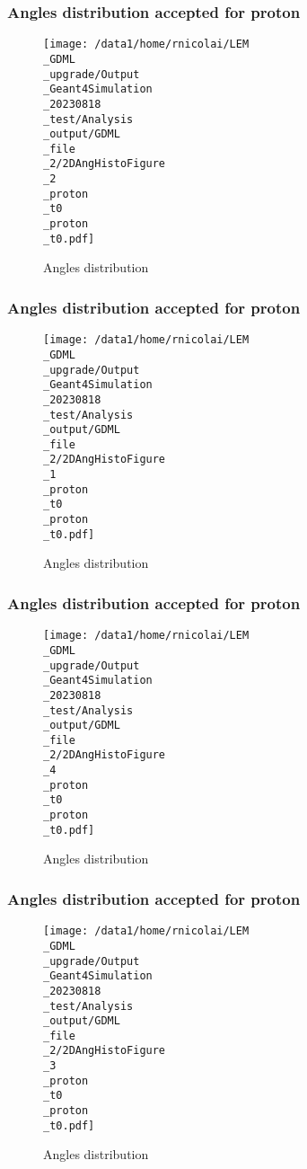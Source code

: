 \documentclass[8pt]{beamer}
\begin{document}
            \begin{frame}
                \frametitle{Angles distribution accepted for proton}
            
        \begin{figure}[h]
            \centering
            \texttt{[image: /data1/home/rnicolai/LEM\\\_GDML\\\_upgrade/Output\\\_Geant4Simulation\\\_20230818\\\_test/Analysis\\\_output/GDML\\\_file\\\_2/2DAngHistoFigure\\\_2\\\_proton\\\_t0\\\_proton\\\_t0.pdf]}
            \caption{Angles distribution}
        \end{figure}
        
            \end{frame}
            
            \begin{frame}
                \frametitle{Angles distribution accepted for proton}
            
        \begin{figure}[h]
            \centering
            \texttt{[image: /data1/home/rnicolai/LEM\\\_GDML\\\_upgrade/Output\\\_Geant4Simulation\\\_20230818\\\_test/Analysis\\\_output/GDML\\\_file\\\_2/2DAngHistoFigure\\\_1\\\_proton\\\_t0\\\_proton\\\_t0.pdf]}
            \caption{Angles distribution}
        \end{figure}
        
            \end{frame}
            
            \begin{frame}
                \frametitle{Angles distribution accepted for proton}
            
        \begin{figure}[h]
            \centering
            \texttt{[image: /data1/home/rnicolai/LEM\\\_GDML\\\_upgrade/Output\\\_Geant4Simulation\\\_20230818\\\_test/Analysis\\\_output/GDML\\\_file\\\_2/2DAngHistoFigure\\\_4\\\_proton\\\_t0\\\_proton\\\_t0.pdf]}
            \caption{Angles distribution}
        \end{figure}
        
            \end{frame}
            
            \begin{frame}
                \frametitle{Angles distribution accepted for proton}
            
        \begin{figure}[h]
            \centering
            \texttt{[image: /data1/home/rnicolai/LEM\\\_GDML\\\_upgrade/Output\\\_Geant4Simulation\\\_20230818\\\_test/Analysis\\\_output/GDML\\\_file\\\_2/2DAngHistoFigure\\\_3\\\_proton\\\_t0\\\_proton\\\_t0.pdf]}
            \caption{Angles distribution}
        \end{figure}
        
            \end{frame}
            
\end{document}
